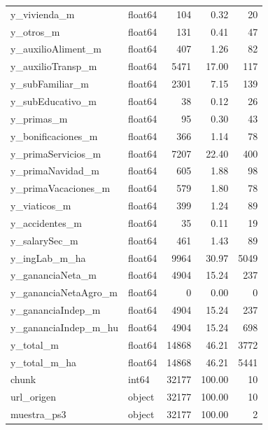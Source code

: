 \begin{longtable}{llrrr}
y\_vivienda\_m & float64 & 104 & 0.32 & 20 \\
y\_otros\_m & float64 & 131 & 0.41 & 47 \\
y\_auxilioAliment\_m & float64 & 407 & 1.26 & 82 \\
y\_auxilioTransp\_m & float64 & 5471 & 17.00 & 117 \\
y\_subFamiliar\_m & float64 & 2301 & 7.15 & 139 \\
y\_subEducativo\_m & float64 & 38 & 0.12 & 26 \\
y\_primas\_m & float64 & 95 & 0.30 & 43 \\
y\_bonificaciones\_m & float64 & 366 & 1.14 & 78 \\
y\_primaServicios\_m & float64 & 7207 & 22.40 & 400 \\
y\_primaNavidad\_m & float64 & 605 & 1.88 & 98 \\
y\_primaVacaciones\_m & float64 & 579 & 1.80 & 78 \\
y\_viaticos\_m & float64 & 399 & 1.24 & 89 \\
y\_accidentes\_m & float64 & 35 & 0.11 & 19 \\
y\_salarySec\_m & float64 & 461 & 1.43 & 89 \\
y\_ingLab\_m\_ha & float64 & 9964 & 30.97 & 5049 \\
y\_gananciaNeta\_m & float64 & 4904 & 15.24 & 237 \\
y\_gananciaNetaAgro\_m & float64 & 0 & 0.00 & 0 \\
y\_gananciaIndep\_m & float64 & 4904 & 15.24 & 237 \\
y\_gananciaIndep\_m\_hu & float64 & 4904 & 15.24 & 698 \\
y\_total\_m & float64 & 14868 & 46.21 & 3772 \\
y\_total\_m\_ha & float64 & 14868 & 46.21 & 5441 \\
chunk & int64 & 32177 & 100.00 & 10 \\
url\_origen & object & 32177 & 100.00 & 10 \\
muestra\_ps3 & object & 32177 & 100.00 & 2 \\
\end{longtable}
